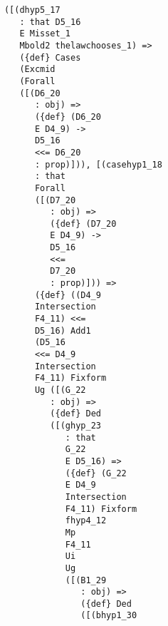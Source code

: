 \documentclass[12pt]{article}
\begin{document}
\begin{verbatim}
                               ([(dhyp5_17 
                                  : that D5_16 
                                  E Misset_1 
                                  Mbold2 thelawchooses_1) => 
                                  ({def} Cases 
                                  (Excmid 
                                  (Forall 
                                  ([(D6_20 
                                     : obj) => 
                                     ({def} (D6_20 
                                     E D4_9) -> 
                                     D5_16 
                                     <<= D6_20 
                                     : prop)])), [(casehyp1_18 
                                     : that 
                                     Forall 
                                     ([(D7_20 
                                        : obj) => 
                                        ({def} (D7_20 
                                        E D4_9) -> 
                                        D5_16 
                                        <<= 
                                        D7_20 
                                        : prop)])) => 
                                     ({def} ((D4_9 
                                     Intersection 
                                     F4_11) <<= 
                                     D5_16) Add1 
                                     (D5_16 
                                     <<= D4_9 
                                     Intersection 
                                     F4_11) Fixform 
                                     Ug ([(G_22 
                                        : obj) => 
                                        ({def} Ded 
                                        ([(ghyp_23 
                                           : that 
                                           G_22 
                                           E D5_16) => 
                                           ({def} (G_22 
                                           E D4_9 
                                           Intersection 
                                           F4_11) Fixform 
                                           fhyp4_12 
                                           Mp 
                                           F4_11 
                                           Ui 
                                           Ug 
                                           ([(B1_29 
                                              : obj) => 
                                              ({def} Ded 
                                              ([(bhyp1_30 

\end{verbatim}
\end{document}
